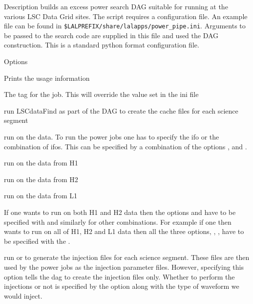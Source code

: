 \begin{entry}
\item[Description] 
 builds an excess power search DAG suitable for
running at the various LSC Data Grid sites.   The script requires a
configuration file.   An example file can be found in
\texttt{\$LALPREFIX/share/lalapps/power\_pipe.ini}.   Arguments to be
passed to the search code are supplied in this file and used the DAG
construction.  This is a standard python format configuration file.

\item[Options]\leavevmode
\begin{entry}

\item[\option{--help}] Prints the usage information

\item[\option{--user-tag} \parm{tag}]   The tag for the job.  This will
override the value set in the ini file

\item[\option{--datafind}] run LSCdataFind as part of the DAG to create the
cache files for each science segment

\item[\option{--power}] run  on the data.  To run
the power jobs one has to specify the ifo or the combination of ifos.  This
can be specified by a combination of the options ,
  and .  

\item[\option{--ifo\_h1}] run  on the data from H1

\item[\option{--ifo\_h2}] run  on the data from H2

\item[\option{--ifo\_l}] run  on the data from L1

If one wants to run on both H1 and H2 data then the options 
and  have to be specified with  and 
similarly for other combinations.  For example if one then wants to run on 
all of H1,  H2 and L1 data then all the three options,  ,
 ,   have to be specified with the 
.

\item[\option{--makeinjfiles}] run  or 
 to generate the injection files for each science
segment. These files are then used by the power jobs as the injection
parameter files.  However,  specifying this option tells the dag to 
create the injection files only.  Whether to perform the injections or not
is specified by the option  along with the type of 
waveform we would inject.    


\end{entry}
\end{entry}

